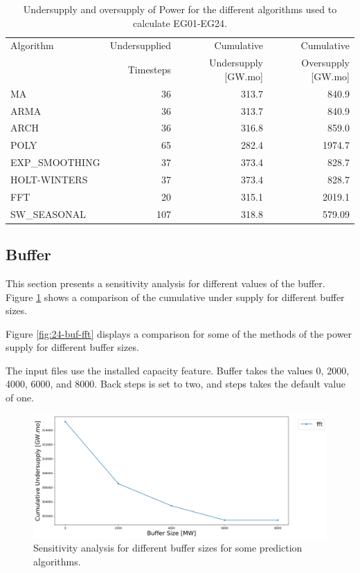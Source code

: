 \documentclass[11pt]{article}
\begin{document}
\begin{table}[H]
	\centering
	\caption{Undersupply and oversupply of Power for the different algorithms used to calculate EG01-EG24.}
	\label{tab:24-lin-power}
	\begin{tabularx}{\textwidth}{lRRR}
		\hline
		Algorithm & Undersupplied & Cumulative  & Cumulative \\
		& Timesteps     & Undersupply [GW.mo]  & Oversupply [GW.mo] \\ \hline
		MA        & 36 	& 313.7 & 840.9 \\ 
		ARMA      & 36 	& 313.7 & 840.9 \\ 
		ARCH      & 36 	& 316.8 & 859.0 \\ 
		POLY      &  65 & 282.4 & 1974.7 \\ 
		EXP\_SMOOTHING 	& 37 & 373.4 & 828.7 \\ 
		HOLT-WINTERS  	& 37 & 373.4 & 828.7 \\ 
		FFT       & 20	& 315.1	& 2019.1 \\ 
		SW\_SEASONAL    & 107 & 318.8 & 579.09 \\ \hline
	\end{tabularx}
\end{table}

\subsection{Buffer}

This section presents a sensitivity analysis for different values of the buffer. Figure \ref{fig:24-buff} shows a comparison of the cumulative under supply for different buffer sizes.

Figure \ref{fig:24-buf-fft} displays a comparison for some of the methods of the power supply for different buffer sizes.

The input files use the installed capacity feature. Buffer takes the values 0, 2000, 4000, 6000, and 8000. Back steps is set to two, and steps takes the default value of one.

\begin{figure}[H]
	\centering
	\includegraphics[width=\textwidth]{24-figures/24-sens-buffer.png} 
	\hfill
	\caption{Sensitivity analysis for different buffer sizes for some prediction algorithms.}
	\label{fig:24-buff}
\end{figure}
\end{document}

